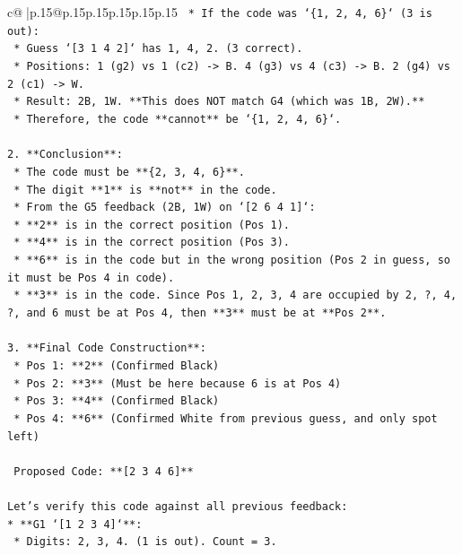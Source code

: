 \documentclass{article}
\begin{document}
{\begin{supertabular}{c@{$\;$}|p{.15\linewidth}@{}p{.15\linewidth}p{.15\linewidth}p{.15\linewidth}p{.15\linewidth}p{.15\linewidth}}
{{{\texttt{        *   If the code was `\{1, 2, 4, 6\}` (3 is out):} \\
\texttt{            *   Guess `{[}3 1 4 2{]}` has 1, 4, 2. (3 correct).} \\
\texttt{            *   Positions: 1 (g2) vs 1 (c2) {-}> B. 4 (g3) vs 4 (c3) {-}> B. 2 (g4) vs 2 (c1) {-}> W.} \\
\texttt{            *   Result: 2B, 1W. **This does NOT match G4 (which was 1B, 2W).**} \\
\texttt{            *   Therefore, the code **cannot** be `\{1, 2, 4, 6\}`.} \\
\\ 
\texttt{2.  **Conclusion**:} \\
\texttt{    *   The code must be **\{2, 3, 4, 6\}**.} \\
\texttt{    *   The digit **1** is **not** in the code.} \\
\texttt{    *   From the G5 feedback (2B, 1W) on `{[}2 6 4 1{]}`:} \\
\texttt{        *   **2** is in the correct position (Pos 1).} \\
\texttt{        *   **4** is in the correct position (Pos 3).} \\
\texttt{        *   **6** is in the code but in the wrong position (Pos 2 in guess, so it must be Pos 4 in code).} \\
\texttt{        *   **3** is in the code. Since Pos 1, 2, 3, 4 are occupied by 2, ?, 4, ?, and 6 must be at Pos 4, then **3** must be at **Pos 2**.} \\
\\ 
\texttt{3.  **Final Code Construction**:} \\
\texttt{    *   Pos 1: **2** (Confirmed Black)} \\
\texttt{    *   Pos 2: **3** (Must be here because 6 is at Pos 4)} \\
\texttt{    *   Pos 3: **4** (Confirmed Black)} \\
\texttt{    *   Pos 4: **6** (Confirmed White from previous guess, and only spot left)} \\
\\ 
\texttt{    Proposed Code: **{[}2 3 4 6{]}**} \\
\\ 
\texttt{Let's verify this code against all previous feedback:} \\
\texttt{*   **G1 `{[}1 2 3 4{]}`**:} \\
\texttt{    *   Digits: 2, 3, 4. (1 is out). Count = 3.} \\
}}}
\end{supertabular}}
\end{document}
